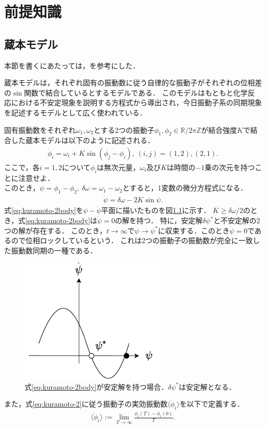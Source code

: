 \documentclass[../main]{subfiles}
\begin{document}
\chapter{前提知識}
\label{chap:prev}
\section{蔵本モデル}
本節を書くにあたっては，\cite{RODRIGUES20161,biorhythm}を参考にした．

蔵本モデルは，それぞれ固有の振動数に従う自律的な振動子がそれぞれの位相差の$\sin$関数で結合しているとするモデルである．
このモデルはもともと化学反応における不安定現象を説明する方程式から導出され\cite{kuramoto1975}，今日振動子系の同期現象を記述するモデルとして広く使われている．

固有振動数をそれぞれ$\omega_1,\omega_2$とする2つの振動子$\phi_1,\phi_2\in\mathbb{R}/2\pi\mathbb{Z}$が結合強度$K$で結合した蔵本モデルは以下のように記述される．
\begin{align}
    \label{eq:kuramoto-2}
    \dot{\phi}_i=\omega_i+K\sin(\phi_j-\phi_i),\ (i,j)=(1,2),(2,1).
\end{align}
ここで，各$i=1,2$について$\phi_i$は無次元量，$\omega_i$及び$K$は時間の$-1$乗の次元を持つことに注意せよ．\\
このとき，$\psi=\phi_1-\phi_2,\ \delta\omega=\omega_1-\omega_2$とすると，1変数の微分方程式になる．
\begin{align}
    \label{eq:kuramoto-2body}
    \dot{\psi}=\delta\omega-2K\sin\psi.  
\end{align}
式\eqref{eq:kuramoto-2body}を$\psi-\dot{\psi}$平面に描いたものを図\ref{fig:kuramoto-2}に示す．
$K\geq\delta\omega/2$のとき，式\eqref{eq:kuramoto-2body}は$\dot{\psi}=0$の解を持つ．
特に，安定解$\delta\psi^\ast$と不安定解の2つの解が存在する．
このとき，$t\to\infty$で$\psi\to\psi^\ast$に収束する．このとき$\dot{\psi}=0$であるので位相ロックしているという．
これは2つの振動子の振動数が完全に一致した振動数同期の一種である．\\
\begin{figure}[tbp]
\centering
\includegraphics[width=70mm]{images/kuramoto-2.pdf}
\centering
\caption{式\eqref{eq:kuramoto-2body}が安定解を持つ場合．$\delta\psi^\ast$は安定解となる．}
\label{fig:kuramoto-2}
\end{figure}
また，式\eqref{eq:kuramoto-2}に従う振動子の実効振動数$\langle\dot{\phi}_i\rangle$を以下で定義する．
\begin{align}
    \langle\dot{\phi}_i\rangle:=\lim_{T\to\infty}\frac{\phi_i(T)-\phi_i(0)}{T}.
\end{align}
\end{document}
